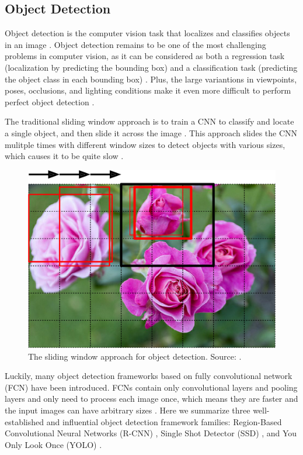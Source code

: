 \documentclass[a4paper,11pt,oneside]{article}
\begin{document}
  \subsection{Object Detection}

  Object detection is the computer vision task that localizes and classifies objects in an image
  \cite{elgendy2020deep, zhao2019object, liu2020deep, geron2019hands}. Object detection remains to be one of the most
  challenging problems in computer vision, as it can be considered as both a regression task (localization by predicting
  the bounding box) and a classification task (predicting the object class in each bounding box)
  \cite{elgendy2020deep, geron2019hands}. Plus, the large variantions in viewpoints, poses, occlusions, and lighting
  conditions make it even more difficult to perform perfect object detection \cite{zhao2019object, liu2020deep}.

  The traditional sliding window approach is to train a CNN to classify and locate a single object, and then slide it
  across the image \cite{geron2019hands, pasquet2017amphora}. This approach slides the CNN mulitple times with different
  window sizes to detect objects with various sizes, which causes it to be quite slow \cite{geron2019hands}.

  \begin{figure}[ht]
    \begin{center}
      \includegraphics[width=.8\textwidth]{sliding_window.png}
    \end{center}
    \caption{The sliding window approach for object detection. Source: \cite{o2019deep}.}
  \end{figure}

  Luckily, many object detection frameworks based on fully convolutional network (FCN) \cite{long2015fully} have been
  introduced. FCNs contain only convolutional layers and pooling layers and only need to process each image once, which
  means they are faster and the input images can have arbitrary sizes \cite{elgendy2020deep, geron2019hands, long2015fully}.
  Here we summarize three well-established and influential object detection framework families: Region-Based Convolutional
  Neural Networks (R-CNN) \cite{girshick2014rich, girshick2015fast, ren2015faster}, Single Shot Detector (SSD)
  \cite{liu2016ssd}, and You Only Look Once (YOLO)
  \cite{redmon2016you, redmon2017yolo9000, redmon2018yolov3, bochkovskiy2020yolov4}.
\end{document}
